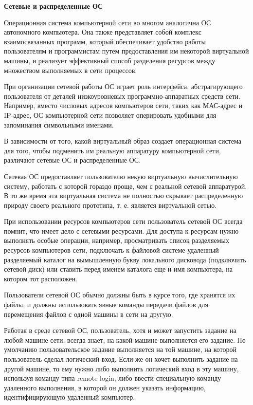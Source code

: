 \begin{center}{\bfseries Сетевые и распределенные ОС}
\end{center}

Операционная система компьютерной сети во многом аналогична ОС автономного компьютера. Она также представляет собой комплекс взаимосвязанных программ, который обеспечивает удобство работы пользователям и программистам путем предоставления им некоторой виртуальной машины, и реализует эффективный способ разделения ресурсов между множеством выполняемых в сети процессов.

При организации сетевой работы ОС играет роль интерфейса, абстрагирующего пользователя от деталей низкоуровневых программно-аппаратных средств сети. Например, вместо числовых адресов компьютеров сети, таких как МАС-адрес и IP-адрес, ОС компьютерной сети позволяет оперировать удобными для запоминания символьными именами.

В зависимости от того, какой виртуальный образ создает операционная система для того, чтобы подменить им реальную аппаратуру компьютерной сети, различают сетевые ОС и распределенные ОС.

Сетевая ОС предоставляет пользователю некую виртуальную вычислительную систему, работать с которой гораздо проще, чем с реальной сетевой аппаратурой. В то же время эта виртуальная система не полностью скрывает распределенную природу своего реального прототипа, т. е. является виртуальной сетью.

При использовании ресурсов компьютеров сети пользователь сетевой ОС всегда помнит, что имеет дело с сетевыми ресурсами. Для доступа к ресурсам нужно выполнять особые операции, например, просматривать список разделяемых ресурсов компьютеров сети, подключать к файловой системе удаленный разделяемый каталог на вымышленную букву локального дисковода (подключить сетевой диск) или ставить перед именем каталога еще и имя компьютера, на котором тот расположен.

Пользователи сетевой ОС обычно должны быть в курсе того, где хранятся их файлы, и должны использовать явные команды передачи файлов для перемещения файлов с одной машины в сети на другую.

Работая в среде сетевой ОС, пользователь, хотя и может запустить задание на любой машине сети, всегда знает, на какой машине выполняется его задание. По умолчанию пользовательское задание выполняется на той машине, на которой пользователь сделал логический вход. Если же он хочет выполнить задание на другой машине, то ему нужно либо выполнить логический вход в эту машину, используя команду типа remote login, либо ввести специальную команду удаленного выполнения, в которой он должен указать информацию, идентифицирующую удаленный компьютер.

